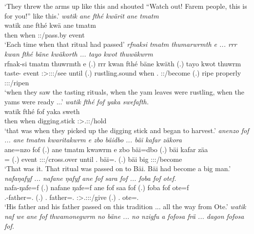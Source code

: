 \begin{exe}
	\trans `They threw the arms up like this and shouted ``Watch out! Farem people, this is for you!'' like this.'
	\emph{watik ane fthé kwärit ane tmatm}\\
	\gll watik ane fthé kwä ane tmatm\\ 
	then {\Dem} when \Stsg:\Sbj:\Iter/pass.by {\Dem} event\\
	\trans `Each time when that ritual had passed'
	\emph{rfnaksi tmatm thumarwrmth e ... rrr kwan fthé bäne kwäkorth ... tayo kwot thuwäkwrm}\\
	\gll rfnak-si tmatm thuwrmth e (.) {rrr kwan} fthé bäne kwäth (.) tayo kwot thuwrm\\ 
	taste-{\Nmlz} event \Stpl:\Sbj>\Stpl:\Obj:\Pst:\Dur/see until (.) rustling.sound when \Recog.{\Abs} \Stpl:\Sbj:\Iter/become (.) ripe properly \Stpl:\Sbj:\Pst:\Dur/ripen\\
	\trans `when they saw the tasting rituals, when the yam leaves were rustling, when the yams were ready ...'
	\emph{watik fthé fof yaka swefafth.}\\
	\gll watik fthé fof yaka sweth\\ 
	then when {\Emph} digging.stick \Stpl:\Sbj>\Tsg.\Masc:\Obj:\Iter/hold\\
	\trans `that was when they picked up the digging stick and began to harvest.'
	\emph{anenzo fof ... ane tmatm kwaritakwrm e zbo bäidbo ... bäi kafar zäkora}\\
	\gll ane=nzo fof (.) ane tmatm kwawrm e zbo bäi=dbo (.) bäi kafar zäa\\ 
	\Dem={\Only} {\Emph} (.) {\Dem} event \Sg:\Sbj:\Pst:\Dur/cross.over until \Prox.{\All} bäi=\All.{\Sg} (.) bäi big \Sg:\Sbj:\Pst:\Pfv/become\\
	\trans `That was it. That ritual was passed on to Bäi. Bäi had become a big man.'
	\emph{nafaŋafyf ... nafane ŋafyf ane fof sara fof ... foba fof otef.}\\
	\gll nafa-ŋafe=f (.) nafane ŋafe=f ane fof saa fof (.) foba fof ote=f\\ 
	\Third.\Poss-father=\Erg.{\Sg} (.) \Tsg.{\Poss} father=\Erg.{\Sg} {\Dem} {\Emph} \Sg:\Sbj>\Tsg.\Masc:\Io:\Pst:\Pfv/give {\Emph} (.) \Dist.{\Abl} {\Emph} ote=\Erg.\Sg\\
	\trans `His father and his father passed on this tradition ... all the way from Ote.'
	\emph{watik naf we ane fof thwamonegwrm no bäne ... no nzigfu a fofosa frä ... dagon fofosa fof.}\\

\end{exe}
